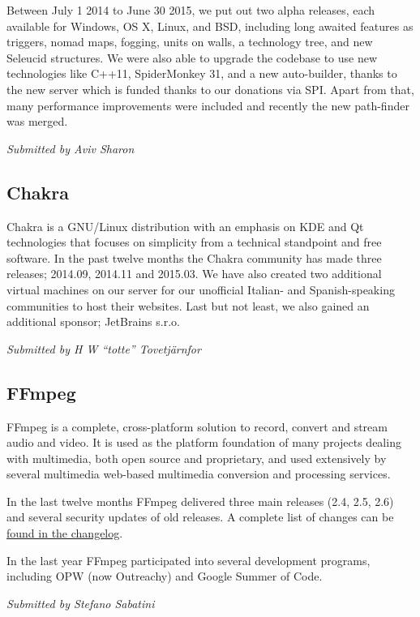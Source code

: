 \documentclass[letterpaper]{report}
\begin{document}
Between July 1 2014 to June 30 2015, we put out two alpha releases, each
available for Windows, OS X, Linux, and BSD, including long awaited
features as triggers, nomad maps, fogging, units on walls, a technology
tree, and new Seleucid structures. We were also able to upgrade the
codebase to use new technologies like C++11, SpiderMonkey 31, and a new
auto-builder, thanks to the new server which is funded thanks to our
donations via SPI. Apart from that, many performance improvements were
included and recently the new path-finder was merged.

{\em Submitted by Aviv Sharon}

\subsection{Chakra}

Chakra is a GNU/Linux distribution with an emphasis on KDE and Qt
technologies that focuses on simplicity from a technical standpoint and
free software.  In the past twelve months the Chakra community has made
three releases; 2014.09, 2014.11 and 2015.03.  We have also created two
additional virtual machines on our server for our unofficial Italian- and
Spanish-speaking communities to host their websites.  Last but not least,
we also gained an additional sponsor; JetBrains s.r.o.

{\em Submitted by H W ``totte'' Tovetjärnfor}

\subsection{FFmpeg}

FFmpeg is a complete, cross-platform solution to record, convert and stream
audio and video. It is used as the platform foundation of many projects
dealing with multimedia, both open source and proprietary, and used
extensively by several multimedia web-based multimedia conversion and
processing services.

In the last twelve months FFmpeg delivered three main releases (2.4, 2.5,
2.6) and several security updates of old releases. A complete list of
changes can be
\href{http://git.videolan.org/?p=ffmpeg.git;a=blob_plain;f=Changelog;hb=HEAD}{found
in the changelog}.

In the last year FFmpeg participated into several development programs,
including OPW (now Outreachy) and Google Summer of Code.

{\em Submitted by Stefano Sabatini}
\end{document}
